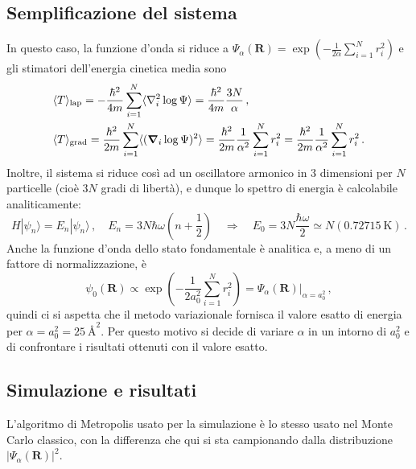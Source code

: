 \documentclass[a4paper, titlepage]{article}
\begin{document}
\subsection{Semplificazione del sistema}
In questo caso, la funzione d'onda si riduce a $\displaystyle \Psi_\alpha(\mathbf{R}) = \exp(-\frac{1}{2\alpha}\sum_{i = 1}^Nr_i^2)$ e gli stimatori dell'energia cinetica media sono
\begin{align*}
    &\langle T \rangle _{\rm lap} = -\frac{\hbar^2}{4m}
    \sum_{i = 1}^N
    \langle\nabla_i^2\log\Psi\rangle = \frac{\hbar^2}{4m} \frac{3N}{\alpha}\, ,\\
    &\langle T \rangle _{\rm grad} = \frac{\hbar^2}{2m}
    \sum_{i = 1}^N
    \langle(\boldsymbol{\nabla}_i\log\Psi)^2\rangle =
    \frac{\hbar^2}{2m} \frac{1}{\alpha^2}
    \sum_{i=1}^N r_i^2 = \frac{\hbar^2}{2m} \frac{1}{\alpha^2}\sum_{i=1}^N r_i^2\, .
\end{align*}
Inoltre, il sistema si riduce così ad un oscillatore armonico in 3 dimensioni per $N$ particelle (cioè $3N$ gradi di libertà), e dunque lo spettro di energia è calcolabile analiticamente:
\[
H|\psi_n\rangle = E_n|\psi_n\rangle \, , \quad
E_n = 3N\hbar\omega\left(n + \frac{1}{2}\right) \quad \Rightarrow \quad E_0 = 3N\frac{\hbar\omega}{2} \simeq N(0.72715\ \unit{\kelvin})\, .
\]
Anche la funzione d'onda dello stato fondamentale è analitica e, a meno di un fattore di normalizzazione, è
\[
\psi_0(\mathbf{R}) \propto \exp\left(-\frac{1}{2a_0^2}\sum_{i = 1}^Nr_i^2\right) = \Psi_\alpha(\mathbf{R})|_{\alpha = a_0^2}\, ,
\]
quindi ci si aspetta che il metodo variazionale fornisca il valore esatto di energia per $\alpha = a_0^2 = 25\ \unit{\angstrom\squared}$. Per questo motivo si decide di variare $\alpha$ in un intorno di $a_0^2$ e di confrontare i risultati ottenuti con il valore esatto.

\subsection{Simulazione e risultati}
L'algoritmo di Metropolis usato per la simulazione è lo stesso usato nel Monte Carlo classico, con la differenza che qui si sta campionando dalla distribuzione $|\Psi_\alpha(\mathbf{R})|^2$. 
\end{document}
